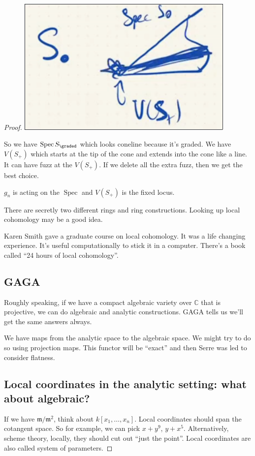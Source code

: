 \documentclass{book}
\newcommand{\C}{\ensuremath{\mathbb{C}}}
\newcommand{\spec}{\operatorname{Spec}}
\newcommand{\m}{\mathfrak{m}}
\theoremstyle{definition}
\begin{document}
\begin{proof}
\includegraphics[width=0.8\textwidth]{./irrelevant-ideal-geometry.png}

So we have $\spec S_\graded$ which looks coneline because it's graded. We have
$V(S_+)$ which starts at the tip of the cone and extends into the cone like
a line. It can have fuzz at the $V(S_+)$. If we delete all the extra fuzz,
then we get the best choice.

$g_n$ is acting on the $\spec$ and $V(S_+)$ is the fixed locus. 

There are secretly two different rings and ring constructions. Looking up
local cohomology may be a good idea.

Karen Smith gave a graduate course on local cohomology. It was a life changing
experience. It's useful computationally to stick it in a computer. There's
a book called ``24 hours of local cohomology''.

\subsection{GAGA}

Roughly speaking, if we have a compact algebraic variety over $\C$ that is
projective, we can do algebraic and analytic constructions. GAGA tells us we'll
get the same answers always. 

We have maps from the analytic space to the algebraic space. We might try to
do so using projection maps. This functor will be ``exact'' and then Serre
was led to consider flatness.

\subsection{Local coordinates in the analytic setting: what about algebraic?}

If we have $\m/\m^2$, think about $k[x_1, \dots, x_n]$. Local coordinates
should span the cotangent space. So for example, we can pick $x + y^9$,
$y + x^5$.  Alternatively, scheme theory, locally, they should cut out
``just the point''.  Local coordinates are also called system of parameters.


\end{proof}
\end{document}
